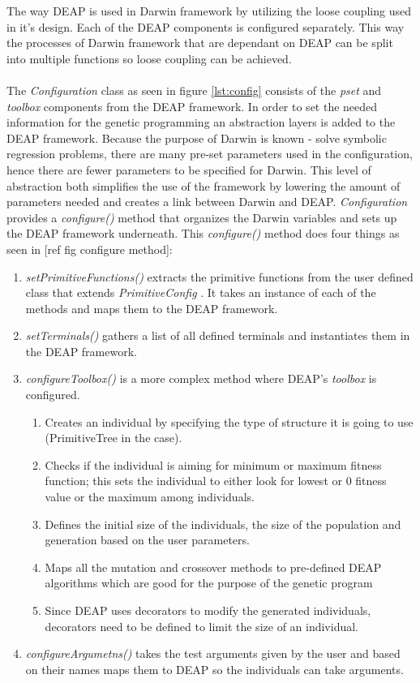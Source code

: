 The way DEAP is used in Darwin framework by utilizing the loose coupling used in it's design. Each of the DEAP components is configured
separately. This way the processes of Darwin framework that are dependant on DEAP can be split into multiple functions so loose coupling can
be achieved.
\paragraph{}
The \textit{Configuration} class as seen in figure \ref{lst:config} consists of the \textit{pset} and \textit{toolbox} components
from the DEAP framework. In order to set the needed information for the genetic programming an abstraction layers is added to the DEAP framework.
Because the purpose of Darwin is known - solve symbolic regression problems, there are many pre-set parameters used in the configuration, hence there are 
fewer parameters to be specified for Darwin. This level of abstraction both simplifies the use of the
framework by lowering the amount of parameters needed and creates a link between Darwin and DEAP. \textit{Configuration} provides a \textit{configure()} method
that organizes the Darwin variables and sets up the DEAP framework underneath. This \textit{configure()} method does four things as seen in [ref fig configure method]:

\begin{enumerate}
  \item \textit{setPrimitiveFunctions()} extracts the primitive functions from the user defined class that extends \textit{PrimitiveConfig} . It takes an instance
of each of the methods and maps them to the DEAP framework.
  \item \textit{setTerminals()} gathers a list of all defined terminals and instantiates them in the DEAP framework.
  \item \textit{configureToolbox()} is a more complex method where DEAP's \textit{toolbox} is configured.
  \begin{enumerate}
	\item Creates an individual by specifying the type of structure it is going to use (PrimitiveTree in the case). 
	\item Checks if the individual is aiming for minimum or maximum fitness function; this sets the individual to either look for lowest or 0 fitness value or the maximum among individuals.
	\item Defines the initial size of the individuals, the size of the population and generation based on the user parameters.
	\item Maps all the mutation and crossover methods to pre-defined DEAP algorithms which are good for the purpose of the genetic program
	\item Since DEAP uses decorators to modify the generated individuals, decorators need to be defined to limit the size of an individual.
  \end{enumerate}
  \item \textit{configureArgumetns()} takes the test arguments given by the user and based on their names maps them to DEAP so the individuals can take arguments.
\end{enumerate}

